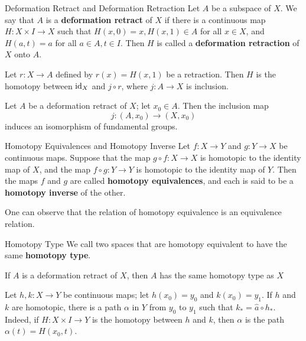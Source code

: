 \documentclass[12pt,a4paper]{article}
\begin{document}
    \begin{defi}{Deformation Retract and Deformation Retraction}
        Let $A$ be a subspace of $X$. We say that $A$ is a \textbf{deformation retract} of $X$ if there is a continuous map $H:X\times I\to X$ such that $H(x,0)=x,H(x,1)\in A$ for all $x\in X$, and $H(a,t)=a$ for all $a\in A,t\in I$. Then $H$ is called a \textbf{deformation retraction} of $X$ onto $A$.
    \end{defi}
    \begin{remark}
        Let $r:X\to A$ defined by $r(x)=H(x,1)$ be a retraction. Then $H$ is the homotopy between $\operatorname{id}_X$ and $j\circ r$, where $j:A\to X$ is inclusion.
    \end{remark}
    \begin{thm}
        Let $A$ be a deformation retract of $X$; let $x_0\in A$. Then the inclusion map
        \[
            j:(A,x_0)\to (X,x_0)
        \]
        induces an isomorphism of fundamental groups.
    \end{thm}
    \bigskip

    \begin{defi}{Homotopy Equivalences and Homotopy Inverse}
        Let $f:X\to Y$ and $g:Y\to X$ be continuous maps. Suppose that the map $g\circ f:X\to X$ is homotopic to the identity map of $X$, and the map $f\circ g:Y\to Y$ is homotopic to the identity map of $Y$. Then the maps $f$ and $g$ are called \textbf{homotopy equivalences}, and each is said to be a \textbf{homotopy inverse} of the other.
    \end{defi}
    \begin{remark}
        One can observe that the relation of homotopy equivalence is an equivalence relation.
    \end{remark}
    \begin{defi}{Homotopy Type}
         We call two spaces that are homotopy equivalent to have the same \textbf{homotopy type}. 
    \end{defi}
    \begin{remark}
        If $A$ is a deformation retract of $X$, then $A$ has the same homotopy type as $X$
    \end{remark}
    \bigskip

    \begin{lemma}
        Let $h,k:X\to Y$ be continuous maps; let $h(x_0)=y_0$ and $k(x_0)=y_1$. If $h$ and $k$ are homotopic, there is a path $\alpha$ in $Y$ from $y_0$ to $y_1$ such that $k_*=\hat{a}\circ h_*$. Indeed, if $H:X\times I\to Y$ is the homotopy between $h$ and $k$, then $\alpha$ is the path $\alpha(t)=H(x_0,t)$.
    \end{lemma}
    \bigskip
\end{document}
